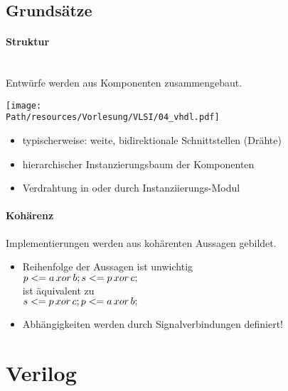 \subsection{Grundsätze}
	\paragraph{Struktur}\hfill\\
	Entwürfe werden aus Komponenten zusammengebaut.\\
	\begin{center}
		\texttt{[image: \\Path/resources/Vorlesung/VLSI/04\_vhdl.pdf]}
	\end{center}
	\begin{itemize}
		\item typischerweise: weite, bidirektionale Schnittstellen (Drähte)
		\item hierarchischer Instanzierungsbaum der Komponenten
		\item Verdrahtung in oder durch Instanziierungs-Modul
	\end{itemize}
	
	\paragraph{Kohärenz}
	Implementierungen werden aus kohärenten Aussagen gebildet.
	\begin{itemize}
		\item Reihenfolge der Aussagen ist unwichtig\\
			\(p <= a\, xor\, b;\\s <= p\, xor\, c;\)\\
			ist äquivalent zu\\
			\(s <= p\, xor\, c;\\p <= a\, xor\, b;\)
		\item Abhängigkeiten werden durch Signalverbindungen definiert!
	\end{itemize}
	
\section{Verilog}

